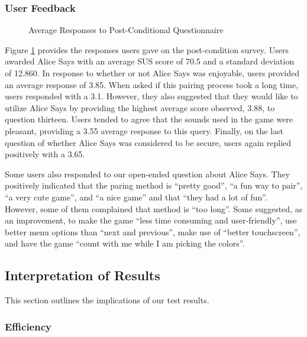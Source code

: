 \subsubsection{User Feedback}

\begin{figure}[htbp]
\caption{{{Average Responses to Post-Conditional Questionnaire}}}
  \label{fig:survey_results}
\end{figure}

Figure \ref{fig:survey_results} provides the responses users gave on the
post-condition survey. Users awarded Alice Says with an average SUS score of
70.5 and a standard deviation of 12.860. In response to whether or not Alice
Says was enjoyable, users provided an average response of 3.85. When asked if
this pairing process took a long time, users responded with a 3.1. However,
they also suggested that they would like to utilize Alice Says by providing the
highest average score observed, 3.88, to question thirteen. Users tended to
agree that the sounds used in the game were pleasant, providing a 3.55 average
response to this query. Finally, on the last question of whether Alice Says was
considered to be secure, users again replied positively with a 3.65.

Some users also responded to our open-ended question about Alice Says.  They
positively indicated that the paring method is ``pretty good'', ``a fun way to
pair'', ``a very cute game'', and ``a nice game'' and that ``they had a lot of
fun''.  However, some of them complained that method is ``too long''.  Some
suggested, as an improvement, to make the game ``less time consuming and
user-friendly'', use better menu options than ``next and previous'', make use
of ``better touchscreen'', and have the game ``count with me while I am picking
the colors''.



\subsection{Interpretation of Results}

This section outlines the implications of our test results.

\subsubsection{Efficiency}


